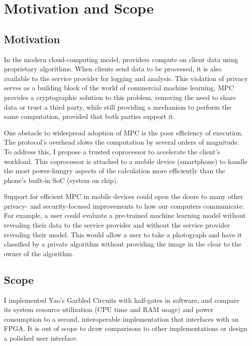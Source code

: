 \section{Motivation and Scope}

\subsection{Motivation}
In the modern cloud-computing model, providers compute on client data using proprietary algorithms. When clients send data to be processed, it is also available to the service provider for logging and analysis. This violation of privacy serves as a building block of the world of commercial machine learning. MPC provides a cryptographic solution to this problem, removing the need to share data or trust a third party, while still providing a mechanism to perform the same computation, provided that both parties support it.

One obstacle to widespread adoption of MPC is the poor efficiency of execution. The protocol's overhead slows the computation by several orders of magnitude. To address this, I propose a trusted coprocessor to accelerate the client's workload. This coprocessor is attached to a mobile device (smartphone) to handle the most power-hungry aspects of the calculation more efficiently than the phone's built-in SoC (system on chip).

Support for efficient MPC in mobile devices could open the doors to many other privacy- and security-focused improvements to how our computers communicate. For example, a user could evaluate a pre-trained machine learning model without revealing their data to the service provider and without the service provider revealing their model\cite{NeuralNets}. This would allow a user to take a photograph and have it classified by a private algorithm without providing the image in the clear to the owner of the algorithm.


\subsection{Scope}
I implemented  Yao's Garbled Circuits with half-gates in software, and compare its system resource utilization (CPU time and RAM usage) and power consumption to a second, interoperable implementation that interfaces with an FPGA\@. It is out of scope to draw comparisons to other implementations or design a polished user interface.
